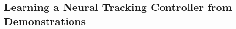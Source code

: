 \vspace{-5pt}
\subsection{Learning a Neural Tracking Controller from Demonstrations} \label{sec:method_il_rl} 
\vspace{-5pt}




